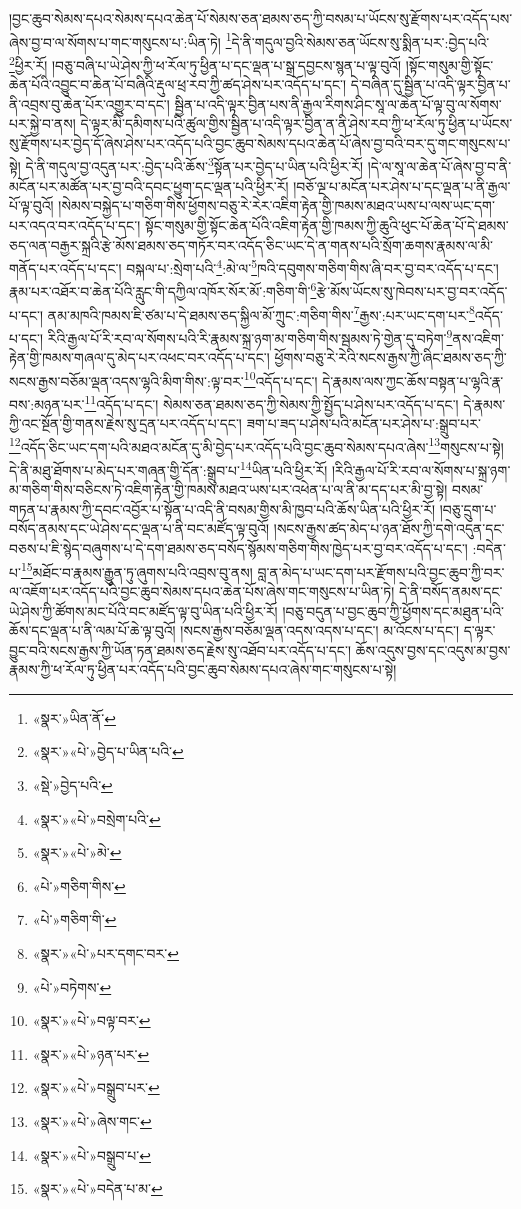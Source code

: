 །བྱང་ཆུབ་སེམས་དཔའ་སེམས་དཔའ་ཆེན་པོ་སེམས་ཅན་ཐམས་ཅད་ཀྱི་བསམ་པ་ཡོངས་སུ་རྫོགས་པར་འདོད་པས་ཞེས་བྱ་བ་ལ་སོགས་པ་གང་གསུངས་པ་:ཡིན་ཏེ། \footnote{«སྣར་»ཡིན་ནོ་}དེ་ནི་གདུལ་བྱའི་སེམས་ཅན་ཡོངས་སུ་སྨིན་པར་:བྱེད་པའི་\footnote{«སྣར་»«པེ་»བྱེད་པ་ཡིན་པའི་}ཕྱིར་རོ། །བཅུ་བཞི་པ་ཡེ་ཤེས་ཀྱི་ཕ་རོལ་ཏུ་ཕྱིན་པ་དང་ལྡན་པ་སྒྲ་དབྱངས་སྙན་པ་ལྟ་བུའོ། །སྟོང་གསུམ་གྱི་སྟོང་ཆེན་པོའི་འབྱུང་བ་ཆེན་པོ་བཞིའི་རྡུལ་ཕྲ་རབ་ཀྱི་ཚད་ཤེས་པར་འདོད་པ་དང་། དེ་བཞིན་དུ་སྦྱིན་པ་འདི་ལྟར་བྱིན་པ་ནི་འབྲས་བུ་ཆེན་པོར་འགྱུར་བ་དང་། སྦྱིན་པ་འདི་ལྟར་བྱིན་པས་ནི་རྒྱལ་རིགས་ཤིང་སཱ་ལ་ཆེན་པོ་ལྟ་བུ་ལ་སོགས་པར་སྐྱེ་བ་ནས། དེ་ལྟར་མི་དམིགས་པའི་ཚུལ་གྱིས་སྦྱིན་པ་འདི་ལྟར་བྱིན་ན་ནི་ཤེས་རབ་ཀྱི་ཕ་རོལ་ཏུ་ཕྱིན་པ་ཡོངས་སུ་རྫོགས་པར་བྱེད་དོ་ཞེས་ཤེས་པར་འདོད་པའི་བྱང་ཆུབ་སེམས་དཔའ་ཆེན་པོ་ཞེས་བྱ་བའི་བར་དུ་གང་གསུངས་པ་སྟེ། དེ་ནི་གདུལ་བྱ་འདུན་པར་:བྱེད་པའི་ཆོས་\footnote{«སྡེ་»བྱེད་པའི་}སྟོན་པར་བྱེད་པ་ཡིན་པའི་ཕྱིར་རོ། །དེ་ལ་སཱ་ལ་ཆེན་པོ་ཞེས་བྱ་བ་ནི་མངོན་པར་མཚོན་པར་བྱ་བའི་དབང་ཕྱུག་དང་ལྡན་པའི་ཕྱིར་རོ། །བཅོ་ལྔ་པ་མངོན་པར་ཤེས་པ་དང་ལྡན་པ་ནི་རྒྱལ་པོ་ལྟ་བུའོ། །སེམས་བསྐྱེད་པ་གཅིག་གིས་ཕྱོགས་བཅུ་རེ་རེར་འཇིག་རྟེན་གྱི་ཁམས་མཐའ་ཡས་པ་ལས་ཡང་དག་པར་འདའ་བར་འདོད་པ་དང་། སྟོང་གསུམ་གྱི་སྟོང་ཆེན་པོའི་འཇིག་རྟེན་གྱི་ཁམས་ཀྱི་ཆུའི་ཕུང་པོ་ཆེན་པོ་དེ་ཐམས་ཅད་ལན་བརྒྱར་སྐྲའི་རྩེ་མོས་ཐམས་ཅད་གཏོར་བར་འདོད་ཅིང་ཡང་དེ་ན་གནས་པའི་སྲོག་ཆགས་རྣམས་ལ་མི་གནོད་པར་འདོད་པ་དང་། བསྐལ་པ་:སྲེག་པའི་\footnote{«སྣར་»«པེ་»བསྲེག་པའི་}:མེ་ལ་\footnote{«སྣར་»«པེ་»མེ་}ཁའི་དབུགས་གཅིག་གིས་ཞི་བར་བྱ་བར་འདོད་པ་དང་། རྣམ་པར་འཐོར་བ་ཆེན་པོའི་རླུང་གི་དཀྱིལ་འཁོར་སོར་མོ་:གཅིག་གི་\footnote{«པེ་»གཅིག་གིས་}རྩེ་མོས་ཡོངས་སུ་ཁེབས་པར་བྱ་བར་འདོད་པ་དང་། ནམ་མཁའི་ཁམས་ཇི་ཙམ་པ་དེ་ཐམས་ཅད་སྐྱིལ་མོ་ཀྲུང་:གཅིག་གིས་\footnote{«པེ་»གཅིག་གི་}རྒྱས་:པར་ཡང་དག་པར་\footnote{«སྣར་»«པེ་»པར་དགང་བར་}འདོད་པ་དང་། རིའི་རྒྱལ་པོ་རི་རབ་ལ་སོགས་པའི་རི་རྣམས་སྐྲ་ཉག་མ་གཅིག་གིས་སྦམས་ཏེ་གྱེན་དུ་བཏེག་\footnote{«པེ་»བཏེགས་}ནས་འཇིག་རྟེན་གྱི་ཁམས་གཞལ་དུ་མེད་པར་འཕང་བར་འདོད་པ་དང་། ཕྱོགས་བཅུ་རེ་རེའི་སངས་རྒྱས་ཀྱི་ཞིང་ཐམས་ཅད་ཀྱི་སངས་རྒྱས་བཅོམ་ལྡན་འདས་ལྷའི་མིག་གིས་:ལྟ་བར་\footnote{«སྣར་»«པེ་»བལྟ་བར་}འདོད་པ་དང་། དེ་རྣམས་ལས་ཀྱང་ཆོས་བསྟན་པ་ལྷའི་རྣ་བས་:མཉན་པར་\footnote{«སྣར་»«པེ་»ཉན་པར་}འདོད་པ་དང་། སེམས་ཅན་ཐམས་ཅད་ཀྱི་སེམས་ཀྱི་སྤྱོད་པ་ཤེས་པར་འདོད་པ་དང་། དེ་རྣམས་ཀྱི་འང་སྔོན་གྱི་གནས་རྗེས་སུ་དྲན་པར་འདོད་པ་དང་། ཟག་པ་ཟད་པ་ཤེས་པའི་མངོན་པར་ཤེས་པ་:སྒྲུབ་པར་\footnote{«སྣར་»«པེ་»བསྒྲུབ་པར་}འདོད་ཅིང་ཡང་དག་པའི་མཐའ་མངོན་དུ་མི་བྱེད་པར་འདོད་པའི་བྱང་ཆུབ་སེམས་དཔའ་ཞེས་\footnote{«སྣར་»«པེ་»ཞེས་གང་}གསུངས་པ་སྟེ། དེ་ནི་མཐུ་ཐོགས་པ་མེད་པར་གཞན་གྱི་དོན་:སྒྲུབ་པ་\footnote{«སྣར་»«པེ་»བསྒྲུབ་པ་}ཡིན་པའི་ཕྱིར་རོ། །རིའི་རྒྱལ་པོ་རི་རབ་ལ་སོགས་པ་སྐྲ་ཉག་མ་གཅིག་གིས་བཅིངས་ཏེ་འཇིག་རྟེན་གྱི་ཁམས་མཐའ་ཡས་པར་འཕེན་པ་ལ་ནི་མ་དད་པར་མི་བྱ་སྟེ། བསམ་གཏན་པ་རྣམས་ཀྱི་དབང་འབྱོར་པ་སྟོན་པ་འདི་ནི་བསམ་གྱིས་མི་ཁྱབ་པའི་ཆོས་ཡིན་པའི་ཕྱིར་རོ། །བཅུ་དྲུག་པ་བསོད་ནམས་དང་ཡེ་ཤེས་དང་ལྡན་པ་ནི་བང་མཛོད་ལྟ་བུའོ། །སངས་རྒྱས་ཚད་མེད་པ་ཉན་ཐོས་ཀྱི་དགེ་འདུན་དང་བཅས་པ་ཇི་སྙེད་བཞུགས་པ་དེ་དག་ཐམས་ཅད་བསོད་སྙོམས་གཅིག་གིས་ཁྱེད་པར་བྱ་བར་འདོད་པ་དང་། :བདེན་པ་\footnote{«སྣར་»«པེ་»བདེན་པ་མ་}མཐོང་བ་རྣམས་རྒྱུན་ཏུ་ཞུགས་པའི་འབྲས་བུ་ནས། བླ་ན་མེད་པ་ཡང་དག་པར་རྫོགས་པའི་བྱང་ཆུབ་ཀྱི་བར་ལ་འཇོག་པར་འདོད་པའི་བྱང་ཆུབ་སེམས་དཔའ་ཆེན་པོས་ཞེས་གང་གསུངས་པ་ཡིན་ཏེ། དེ་ནི་བསོད་ནམས་དང་ཡེ་ཤེས་ཀྱི་ཚོགས་མང་པོའི་བང་མཛོད་ལྟ་བུ་ཡིན་པའི་ཕྱིར་རོ། །བཅུ་བདུན་པ་བྱང་ཆུབ་ཀྱི་ཕྱོགས་དང་མཐུན་པའི་ཆོས་དང་ལྡན་པ་ནི་ལམ་པོ་ཆེ་ལྟ་བུའོ། །སངས་རྒྱས་བཅོམ་ལྡན་འདས་འདས་པ་དང་། མ་འོངས་པ་དང་། ད་ལྟར་བྱུང་བའི་སངས་རྒྱས་ཀྱི་ཡོན་ཏན་ཐམས་ཅད་རྗེས་སུ་འཐོབ་པར་འདོད་པ་དང་། ཆོས་འདུས་བྱས་དང་འདུས་མ་བྱས་རྣམས་ཀྱི་ཕ་རོལ་ཏུ་ཕྱིན་པར་འདོད་པའི་བྱང་ཆུབ་སེམས་དཔའ་ཞེས་གང་གསུངས་པ་སྟེ། 